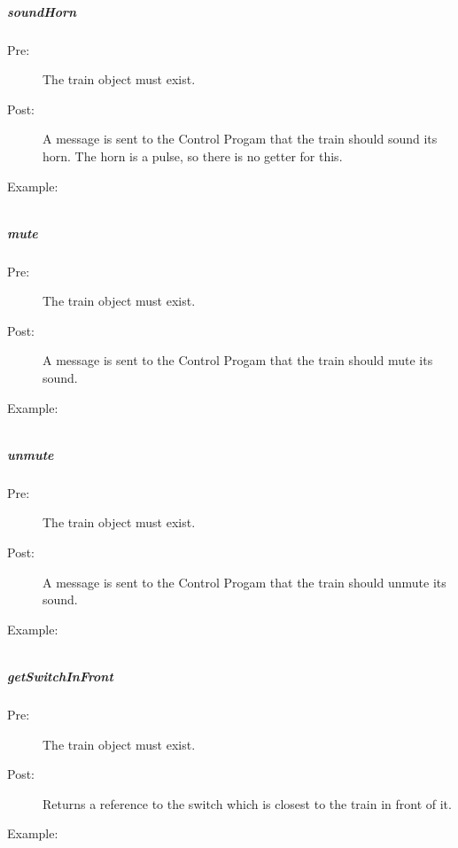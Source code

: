 \documentclass[a4paper,11pt,notitlepage]{article}
\def\CS{Control Progam\xspace} \def\LC{Local Copy of Train State\xspace} \def\TN{Track Node\xspace}
\begin{document}
\subparagraph{soundHorn} 
\begin{description}
\item[\hspace{1cm}Pre:] The train object must exist. 
\item[\hspace{1cm}Post:] A message is sent to the \CS that the train should sound its horn. The horn is a pulse, so there is no getter for this.
\item[\hspace{1cm}Example:]
\begin{verbatim}

\end{verbatim}
\end{description}

\subparagraph{mute} 
\begin{description}
\item[\hspace{1cm}Pre:] The train object must exist. 
\item[\hspace{1cm}Post:] A message is sent to the \CS that the train should mute its sound.
\item[\hspace{1cm}Example:]
\begin{verbatim}

\end{verbatim}
\end{description}

\subparagraph{unmute} 
\begin{description}
\item[\hspace{1cm}Pre:] The train object must exist. 
\item[\hspace{1cm}Post:] A message is sent to the \CS that the train should unmute its sound.
\item[\hspace{1cm}Example:]
\begin{verbatim}

\end{verbatim}
\end{description}

\subparagraph{getSwitchInFront} 
\begin{description}
\item[\hspace{1cm}Pre:] The train object must exist. 
\item[\hspace{1cm}Post:] Returns a reference to the switch which is closest to the train in front of it.
\item[\hspace{1cm}Example:]
\begin{verbatim}

\end{verbatim}
\end{description}
\end{document}
